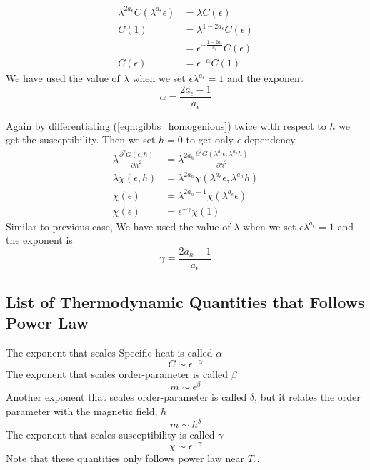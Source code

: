 	\begin{align}
		\lambda^{2 a_\epsilon} C(\lambda^{a_\epsilon} \epsilon) &= \lambda C(\epsilon) \nonumber \\
		C(1) &= \lambda^{1- 2 a_\epsilon} C(\epsilon) \nonumber \\
			 &= \epsilon^{-\frac{1-2 a_\epsilon}{a_\epsilon}} C(\epsilon) \nonumber \\
		C(\epsilon) &= \epsilon^{-\alpha} C(1) \label{eqn:specific_heat_and_alpha}
	\end{align}
	We have used the value of $\lambda$ when we set $\epsilon \lambda^{a_\epsilon}=1$ and the exponent
	\begin{equation}
		\alpha = \frac{2 a_\epsilon - 1}{a_\epsilon}
		\label{eqn:alpha}
	\end{equation}
	
	Again by differentiating (\ref{eqn:gibbs_homogenious}) twice with respect to $h$ we get the susceptibility. Then we set $h=0$ to get only $\epsilon$ dependency.
	\begin{align}
		\lambda \frac{\partial^2 G(\epsilon,h)}{\partial h^2} &= \lambda^{2 a_h} \frac{\partial^2 G(\lambda^{a_\epsilon} \epsilon, \lambda^{a_h} h)}{\partial h^2} \nonumber \\
		\lambda \chi(\epsilon, h) &= \lambda^{2 a_h} \chi(\lambda^{a_\epsilon}\epsilon, \lambda^{a_h} h) \nonumber \\
		\chi(\epsilon) &= \lambda^{2 a_h - 1} \chi(\lambda ^{a_\epsilon} \epsilon) \nonumber \\
		\chi(\epsilon) &= \epsilon^{-\gamma} \chi(1) 
		\label{eqn:susceptibility_homogeneous}
	\end{align}
	Similar to previous case, We have used the value of $\lambda$ when we set $\epsilon \lambda^{a_\epsilon}=1$ and the exponent is
	\begin{equation}
		\gamma = \frac{2 a_h -1}{a_\epsilon}
		\label{eqn:gamma}
	\end{equation}
	\subsection{List of Thermodynamic Quantities that Follows Power Law}
	\label{subsect:list-of-exponents}
	
		The exponent that scales Specific heat is called $\alpha$ 
		\begin{equation}
			C \sim \epsilon^{-\alpha}
		\end{equation}
		The exponent that scales order-parameter is called $\beta$ 
		\begin{equation}
			m \sim \epsilon^{\beta}
		\end{equation}
		Another exponent that scales order-parameter is called $\delta$, but it relates the order parameter with the magnetic field, $h$
		\begin{equation}
			m \sim h^{\delta}
		\end{equation}
		The exponent that scales susceptibility is called $\gamma$ 
		\begin{equation}
			\chi \sim \epsilon^{-\gamma}
		\end{equation}
		Note that these quantities only follows power law near $T_c$.
